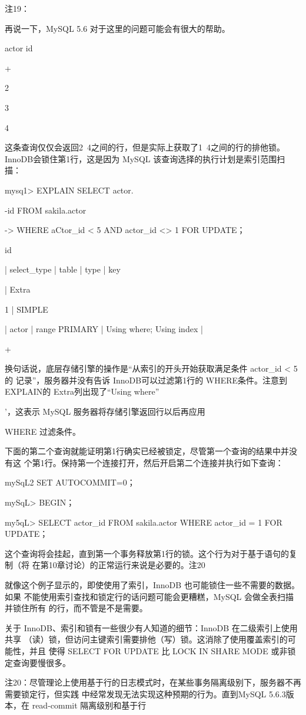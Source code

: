 注19：

再说一下，MySQL 5.6 对于这里的问题可能会有很大的帮助。

actor id

+

2

3

4

这条查询仅仅会返回2~4之间的行，但是实际上获取了1~4之间的行的排他锁。
InnoDB会锁住第1行，这是因为 MySQL 该查询选择的执行计划是索引范围扫描：

mysq1> EXPLAIN SELECT actor.

-id FROM sakila.actor

-> WHERE aCtor\_id < 5 AND actor\_id <> 1 FOR UPDATE；

id

| select\_type | table | type | key

| Extra

1 | SIMPLE

| actor | range PRIMARY | Using where; Using index |

+

换句话说，底层存储引擎的操作是“从索引的开头开始获取满足条件 actor\_id < 5的
记录”，服务器并没有告诉 InnoDB可以过滤第1行的 WHERE条件。注意到 EXPLAIN的
Extra列出现了“Using where”

’，这表示 MySQL 服务器将存储引擎返回行以后再应用

WHERE 过滤条件。

下面的第二个查询就能证明第1行确实已经被锁定，尽管第一个查询的结果中并没有这
个第1行。保持第一个连接打开，然后开启第二个连接并执行如下查询：

mySqL2 SET AUTOCOMMIT=0；

mySqL> BEGIN；

my5qL> SELECT actor\_id FROM sakila.actor WHERE actor\_id = 1 FOR UPDATE；

这个查询将会挂起，直到第一个事务释放第1行的锁。这个行为对于基于语句的复制（将
在第10章讨论）的正常运行来说是必要的。注20

就像这个例子显示的，即使使用了索引，InnoDB 也可能锁住一些不需要的数据。如果
不能使用索引查找和锁定行的话问题可能会更糟糕，MySQL 会做全表扫描并锁住所有
的行，而不管是不是需要。

关于 InnoDB、索引和锁有一些很少有人知道的细节：InnoDB 在二级索引上使用共享
（读）锁，但访问主键索引需要排他（写）锁。这消除了使用覆盖索引的可能性，并且
使得 SELECT FOR UPDATE 比 LOCK IN SHARE MODE 或非锁定查询要慢很多。

注20：尽管理论上使用基于行的日志模式时，在某些事务隔离级别下，服务器不再需要锁定行，但实践
中经常发现无法实现这种预期的行为。直到MySQL 5.6.3版本，在 read-commit 隔离级别和基于行

